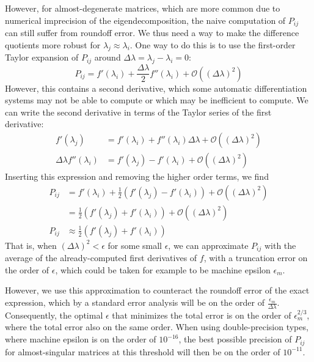 \documentclass[../main.tex]{subfiles}
\begin{document}
\begin{refsection}
However, for almost-degenerate matrices, which are more common due to numerical imprecision of the eigendecomposition, the naive computation of $P_{ij}$ can still suffer from roundoff error.
We thus need a way to make the difference quotients more robust for $\lambda_j \approx \lambda_i$.
One way to do this is to use the first-order Taylor expansion of $P_{ij}$ around $\Delta \lambda = \lambda_j - \lambda_i = 0$:
\[P_{ij} = f'(\lambda_i) + \frac{\Delta \lambda}{2} f''(\lambda_i) + \mathcal{O}((\Delta \lambda)^2)\]
However, this contains a second derivative, which some automatic differentiation systems may not be able to compute or which may be inefficient to compute.
We can write the second derivative in terms of the Taylor series of the first derivative:
\begin{align*}
f'(\lambda_j) &= f'(\lambda_i) + f''(\lambda_i) \Delta \lambda + \mathcal{O}((\Delta \lambda)^2)\\
\Delta\lambda f''(\lambda_i) &= f'(\lambda_j) - f'(\lambda_i) + \mathcal{O}((\Delta \lambda)^2)
\end{align*}
Inserting this expression and removing the higher order terms, we find
\begin{align*}
P_{ij} &= f'(\lambda_i) + \frac{1}{2} \left( f'(\lambda_j) - f'(\lambda_i) \right) +
          \mathcal{O}((\Delta \lambda)^2)\\
       &= \frac{1}{2} \left( f'(\lambda_j) + f'(\lambda_i) \right) +
          \mathcal{O}((\Delta \lambda)^2)\\
P_{ij} &\approx \frac{1}{2} \left( f'(\lambda_j) + f'(\lambda_i) \right)
\end{align*}
That is, when $(\Delta\lambda)^2 < \epsilon$ for some small $\epsilon$, we can approximate $P_{ij}$ with the average of the already-computed first derivatives of $f$, with a truncation error on the order of $\epsilon$, which could be taken for example to be machine epsilon $\epsilon_m$.

However, we use this approximation to counteract the roundoff error of the exact expression, which by a standard error analysis will be on the order of $\frac{\epsilon_m}{\Delta\lambda}$.
Consequently, the optimal $\epsilon$ that minimizes the total error is on the order of $\epsilon_m^{2/3}$, where the total error also on the same order.
When using double-precision types, where machine epsilon is on the order of $10^{-16}$, the best possible precision of $P_{ij}$ for almost-singular matrices at this threshold will then be on the order of $10^{-11}$.


\end{refsection}
\end{document}
